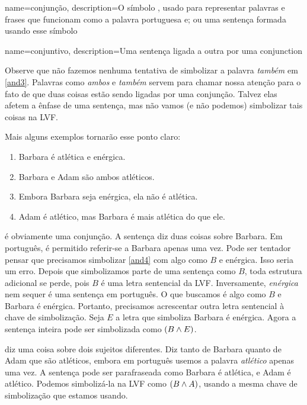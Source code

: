 {
name=conjunção,
description={O símbolo \eand, usado para representar palavras e frases que funcionam como a palavra portuguesa e; ou uma sentença formada usando esse símbolo}
}

{
name=conjuntivo,
description={Uma sentença ligada a outra por uma \gls{conjunction}}
}


Observe que não fazemos nenhuma tentativa de simbolizar a palavra
\emph{também} em \cref*{and3}. Palavras como \emph{ambos} e
\emph{também} servem para chamar nossa atenção para o fato de que duas
coisas estão sendo ligadas por uma conjunção. Talvez elas afetem a ênfase de uma
sentença, mas não vamos (e não podemos) simbolizar tais coisas na LVF.

Mais alguns exemplos tornarão esse ponto claro:
	\begin{enumerate}
		\item\label{and4}Barbara é atlética e enérgica.
		\item\label{and5}Barbara e Adam são ambos atléticos.
		\item\label{and6}Embora Barbara seja enérgica, ela não é atlética.
	\item\label{and7}Adam é atlético, mas Barbara é mais atlética do que ele.
	\end{enumerate}
 é obviamente uma conjunção. A sentença diz duas coisas
sobre Barbara. Em português, é permitido referir-se a Barbara apenas
uma vez. Pode ser tentador pensar que precisamos simbolizar
\cref*{and4} com algo como $B$ e enérgica. Isso seria um erro. Depois
que simbolizamos parte de uma sentença como $B$, toda estrutura
adicional se perde, pois $B$ é uma letra sentencial da LVF. Inversamente,
\emph{enérgica} nem sequer é uma sentença em português. O que buscamos
é algo como $B$ e Barbara é enérgica. Portanto, precisamos acrescentar
outra letra sentencial à chave de simbolização. Seja $E$ a letra que
simboliza Barbara é enérgica. Agora a sentença inteira pode ser
simbolizada como $(B\wedge E)$.

 diz uma coisa sobre dois sujeitos diferentes. Diz tanto de
Barbara quanto de Adam que são atléticos, embora em português usemos a
palavra \emph{atlético} apenas uma vez. A sentença pode ser parafraseada
como Barbara é atlética, e Adam é atlético. Podemos simbolizá-la na LVF
como $(B\wedge A)$, usando a mesma chave de simbolização que estamos
usando.

